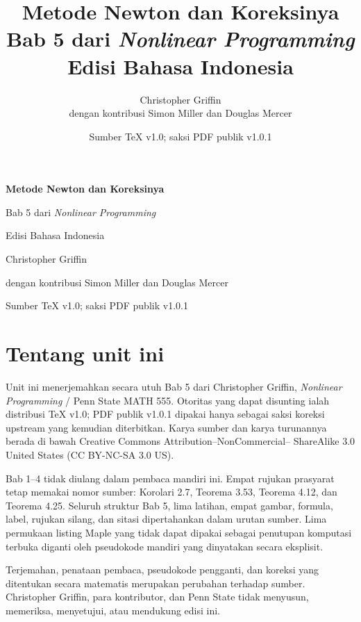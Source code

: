 \documentclass[a4paper,openany,leqno,fleqn,12pt]{amsbook}
\title{Metode Newton dan Koreksinya\\
       {\large Bab 5 dari \emph{Nonlinear Programming}\\Edisi Bahasa Indonesia}}
\author{Christopher Griffin\\
{\small dengan kontribusi Simon Miller dan Douglas Mercer}}
\date{Sumber TeX v1.0; saksi PDF publik v1.0.1}
\numberwithin{equation}{chapter}
\numberwithin{figure}{chapter}
\theoremstyle{definition}
\theoremstyle{remark}
\begin{document}
\begin{titlepage}
\thispagestyle{empty}
\centering
\vspace*{0.18\textheight}
{\LARGE\bfseries Metode Newton dan Koreksinya\par}
\vspace{0.8em}
{\large Bab 5 dari \emph{Nonlinear Programming}\par}
\vspace{0.8em}
{\Large Edisi Bahasa Indonesia\par}
\vspace{3em}
{\large Christopher Griffin\par}
\vspace{0.75em}
{\small dengan kontribusi Simon Miller dan Douglas Mercer\par}
\vfill
{\small Sumber TeX v1.0; saksi PDF publik v1.0.1\par}
\end{titlepage}

\frontmatter
\chapter*{Tentang unit ini}
Unit ini menerjemahkan secara utuh Bab 5 dari Christopher Griffin,
\emph{Nonlinear Programming} / Penn State MATH 555. Otoritas yang dapat
disunting ialah distribusi TeX v1.0; PDF publik v1.0.1 dipakai hanya sebagai
saksi koreksi upstream yang kemudian diterbitkan. Karya sumber dan karya
turunannya berada di bawah Creative Commons Attribution--NonCommercial--
ShareAlike 3.0 United States (CC BY-NC-SA 3.0 US).

\hypertarget{penn-external-references}{}%
Bab 1--4 tidak diulang dalam pembaca mandiri ini. Empat rujukan prasyarat tetap
memakai nomor sumber: Korolari 2.7, Teorema 3.53, Teorema 4.12, dan Teorema
4.25. Seluruh struktur Bab 5, lima latihan, empat gambar, formula, label,
rujukan silang, dan sitasi dipertahankan dalam urutan sumber. Lima permukaan
listing Maple yang tidak dapat dipakai sebagai penutupan komputasi terbuka
diganti oleh pseudokode mandiri yang dinyatakan secara eksplisit.

Terjemahan, penataan pembaca, pseudokode pengganti, dan koreksi yang ditentukan
secara matematis merupakan perubahan terhadap sumber. Christopher Griffin,
para kontributor, dan Penn State tidak menyusun, memeriksa, menyetujui, atau
mendukung edisi ini.

\tableofcontents

\makeatletter
{}
\makeatother
\end{document}
